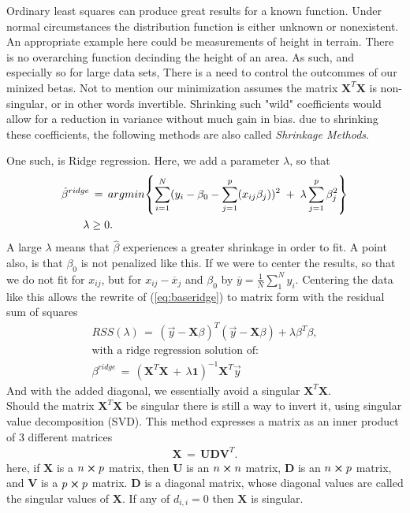 \documentclass[ 12pt, a4paper ]{article}
\begin{document}
Ordinary least squares can produce great results for a known function. Under normal 
circumstances the distribution function is either unknown or nonexistent. An appropriate 
example here could be measurements of height in terrain. There is no overarching function 
decinding the height of an area. As such, and especially so for large data sets, There is a 
need to control the outcommes of our minized betas. Not to mention our minimization assumes 
the matrix $\mathbf{X}^T\mathbf{X}$ is non-singular, or in other words invertible. 
Shrinking such "wild" coefficients would allow for a reduction in variance without much gain
in bias. due to shrinking these coefficients, the following methods are also called 
\textit{Shrinkage Methods}. 

One such, is Ridge regression. Here, we add a parameter $\lambda$, so that 
\begin{align}
    \hat{\beta}^{ridge} &\,=\, 
    argmin\qty{ \sum_{i=1}^N (y_i - \beta_0 - \sum_{j=1}^p(x_{ij}\beta_j) )^2 
        \;+\; \lambda \sum_{j=1}^p \beta_j^2 }\label{eq:baseridge} \\
    \lambda &\geq 0. \nonumber
\end{align}
A large $\lambda$ means that $\hat{\beta}$ experiences a greater shrinkage in order to fit.
A point also, is that $\beta_0$ is not penalized like this. If we were to center the results, 
so that we do not fit for $x_{ij}$, but for $x_{ij} - \overline{x}_j$ and $\beta_0$ by 
$ \overline{y} = \frac{1}{N} \sum_1^N y_i$. %
Centering the data like this allows the rewrite of (\ref{eq:baseridge}) to matrix form
with the residual sum of squares
\begin{align}
    RSS(\lambda) \,=\, (\vec{y} - \mathbf{X}\beta)^T (\vec{y} - \mathbf{X}\beta)
        +   \lambda \beta^T\beta, \\
    \text{with a ridge regression solution of:}\nonumber \\
    \beta^{ridge} \,=\, (\mathbf{X}^T\mathbf{X} \,+\, \lambda \mathbf{1})^{-1}\mathbf{X}^T\vec{y}
    \label{eq:ridgesol}
\end{align}
And with the added diagonal, we essentially avoid a singular $\mathbf{X}^T\mathbf{X}$.\\

Should the matrix $\mathbf{X}^T \mathbf{X}$ be singular there is still a way to invert it, 
using singular value decomposition (SVD). This method expresses a matrix as an inner product 
of 3 different matrices\cite{}%
\begin{align}
    \mathbf{X} \,=\, \mathbf{U}\mathbf{D}\mathbf{V}^T.\label{eq:svdX}
\end{align}
here, if $\mathbf{X}$ is a $n\cross p$ matrix, then $\mathbf{U}$ is an $n \cross n$ matrix, 
$\mathbf{D}$ is an $n\cross p$ matrix, and $\mathbf{V}$ is a $p\cross p$ matrix. $\mathbf{D}$
is a diagonal matrix, whose diagonal values are called the singular values of $\mathbf{X}$.
If any of $d_{i,i}=0$ then $\mathbf{X}$ is singular. 
\end{document}
